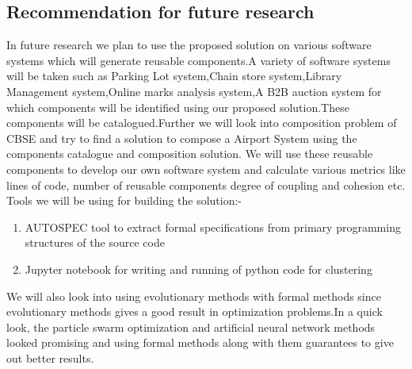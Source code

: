 \documentclass[12pt]{article}
\begin{document}
\subsection{Recommendation for future research}
In future research we plan to use the proposed solution on various software systems which will generate reusable components.A variety of software systems will be taken such as Parking Lot system,Chain store system,Library Management system,Online marks analysis system,A B2B auction system for which components will be identified using our proposed solution.These components will be catalogued.Further we will look into composition problem of CBSE and try to find a solution to compose a Airport System using the components catalogue and composition solution.  We will use these reusable components to develop our own software system and calculate various metrics like lines of code, number of reusable components degree of coupling and cohesion etc.
\\Tools we will be using for building the solution:-
\begin{enumerate}
	\item AUTOSPEC tool to extract formal specifications from primary programming structures of the source code
	\item Jupyter notebook for writing and running of python code for clustering 
\end{enumerate}

We will also look into using evolutionary methods with formal methods since evolutionary methods gives a good result in optimization problems.In a quick look, the particle swarm optimization and artificial neural network methods looked promising and using formal methods along with them guarantees to give out better results.



\end{document}
